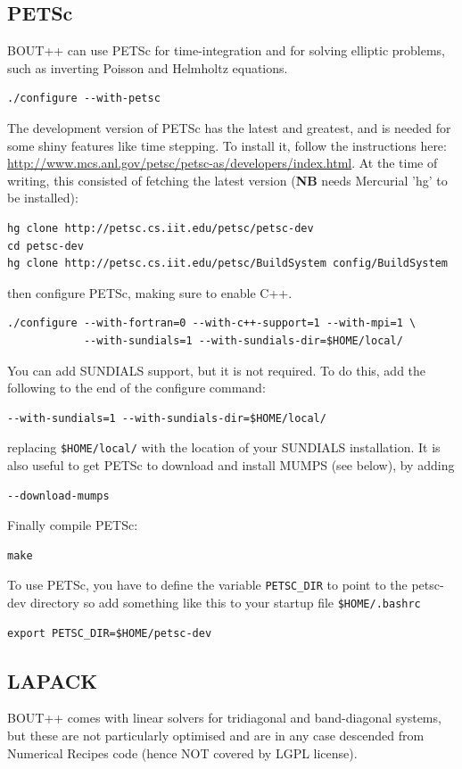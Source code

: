 \documentclass[12pt]{article}
\begin{document}
\subsection{PETSc}
%
BOUT++ can use PETSc for time-integration and for solving elliptic problems,
such as inverting Poisson and Helmholtz equations.
%
\begin{verbatim}
./configure --with-petsc
\end{verbatim}
%
The development version of PETSc has the latest and greatest, and is needed for
some shiny features like time stepping. To install it, follow the instructions
here: \url{http://www.mcs.anl.gov/petsc/petsc-as/developers/index.html}. At the
time of writing, this consisted of fetching the latest version ({\bf NB} needs
Mercurial 'hg' to be installed):
%
\begin{verbatim}
hg clone http://petsc.cs.iit.edu/petsc/petsc-dev
cd petsc-dev
hg clone http://petsc.cs.iit.edu/petsc/BuildSystem config/BuildSystem
\end{verbatim}
%
then configure PETSc, making sure to enable C++.
%
\begin{verbatim}
./configure --with-fortran=0 --with-c++-support=1 --with-mpi=1 \
            --with-sundials=1 --with-sundials-dir=$HOME/local/
\end{verbatim}
%
You can add SUNDIALS support, but it is not required. To do this, add the
following to the end of the configure command:
%
\begin{verbatim}
--with-sundials=1 --with-sundials-dir=$HOME/local/
\end{verbatim}
%
replacing \texttt{\$HOME/local/} with the location of your SUNDIALS
installation.  It is also useful to get PETSc to download and install MUMPS
(see below), by adding
%
\begin{verbatim}
--download-mumps
\end{verbatim}
%
Finally compile PETSc:
%
\begin{verbatim}
make
\end{verbatim}
%
To use PETSc, you have to define the variable \texttt{PETSC\_DIR} to point to
the petsc-dev directory so add something like this to your startup file
\texttt{\$HOME/.bashrc}
%
\begin{verbatim}
export PETSC_DIR=$HOME/petsc-dev
\end{verbatim}
%



\subsection{LAPACK}
%
BOUT++ comes with linear solvers for tridiagonal and band-diagonal systems, but
these are not particularly optimised and are in any case descended from
Numerical Recipes code (hence NOT covered by LGPL license).
\end{document}

